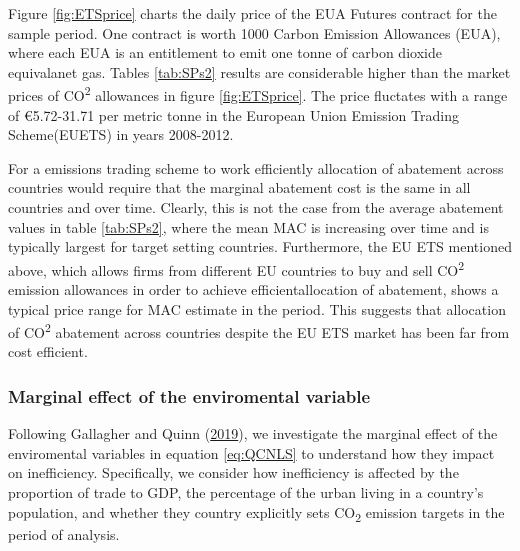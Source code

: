 \documentclass[12pt,]{article}
\begin{document}
Figure \ref{fig:ETSprice} charts the daily price of the EUA Futures contract for the sample period. One contract is worth 1000 Carbon Emission Allowances (EUA), where each EUA is an entitlement to emit one tonne of carbon dioxide equivalanet gas. Tables \ref{tab:SPs2} results are considerable higher than the market prices of CO\textsuperscript{2} allowances in figure \ref{fig:ETSprice}. The price fluctates with a range of €5.72-31.71 per metric tonne in the European Union Emission Trading Scheme(EUETS) in years 2008-2012.

For a emissions trading scheme to work efficiently allocation of abatement across countries would require that the marginal abatement cost is the same in all countries and over time. Clearly, this is not the case from the average abatement values in table \ref{tab:SPs2}, where the mean MAC is increasing over time and is typically largest for target setting countries. Furthermore, the EU ETS mentioned above, which allows firms from different EU countries to buy and sell CO\textsuperscript{2} emission allowances in order to achieve efficientallocation of abatement, shows a typical price range for MAC estimate in the period. This suggests that allocation of CO\textsuperscript{2} abatement across countries despite the EU ETS market has been far from cost efficient.

\hypertarget{marginal-effect-of-the-enviromental-variable}{%
\subsubsection{Marginal effect of the enviromental variable}\label{marginal-effect-of-the-enviromental-variable}}

Following Gallagher and Quinn (\protect\hyperlink{ref-Gallagher2019}{2019}), we investigate the marginal effect of the enviromental variables in equation \eqref{eq:QCNLS} to understand how they impact on inefficiency. Specifically, we consider how inefficiency is affected by the proportion of trade to GDP, the percentage of the urban living in a country's population, and whether they country explicitly sets CO\textsubscript{2} emission targets in the period of analysis.
\end{document}

